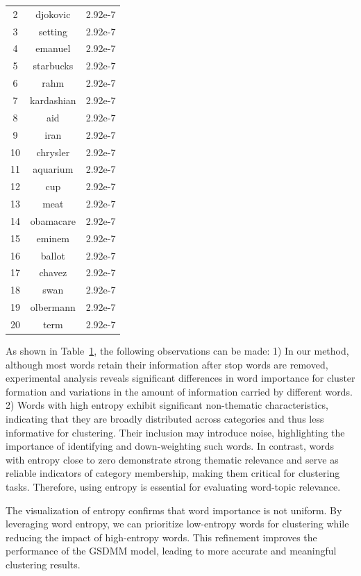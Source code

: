 \begin{table}[htbp]
\begin{minipage}{0.45\linewidth}
\begin{tabular}{ccc}
    2  & djokovic    & 2.92e-7 \\
    3  & setting     & 2.92e-7 \\
    4  & emanuel     & 2.92e-7 \\
    5  & starbucks   & 2.92e-7 \\
    6  & rahm        & 2.92e-7 \\
    7  & kardashian  & 2.92e-7 \\
    8  & aid         & 2.92e-7 \\
    9  & iran        & 2.92e-7 \\
    10 & chrysler    & 2.92e-7 \\
    11 & aquarium    & 2.92e-7 \\
    12 & cup         & 2.92e-7 \\
    13 & meat        & 2.92e-7 \\
    14 & obamacare   & 2.92e-7 \\
    15 & eminem      & 2.92e-7 \\
    16 & ballot      & 2.92e-7 \\
    17 & chavez      & 2.92e-7 \\
    18 & swan        & 2.92e-7 \\
    19 & olbermann   & 2.92e-7 \\
    20 & term        & 2.92e-7 \\
    \bottomrule
    \end{tabular}
\end{minipage}
\label{tab:two_side_by_side}
\end{table}

As shown in Table~\ref{tab:two_side_by_side}, the following observations can be made: 1) In our method, although most words retain their information after stop words are removed, experimental analysis reveals significant differences in word importance for cluster formation and variations in the amount of information carried by different words.
2) Words with high entropy exhibit significant non-thematic characteristics, indicating that they are broadly distributed across categories and thus less informative for clustering. Their inclusion may introduce noise, highlighting the importance of identifying and down-weighting such words. In contrast, words with entropy close to zero demonstrate strong thematic relevance and serve as reliable indicators of category membership, making them critical for clustering tasks. Therefore, using entropy is essential for evaluating word-topic relevance.

The visualization of entropy confirms that word importance is not uniform. By leveraging word entropy, we can prioritize low-entropy words for clustering while reducing the impact of high-entropy words. This refinement improves the performance of the GSDMM model, leading to more accurate and meaningful clustering results.

